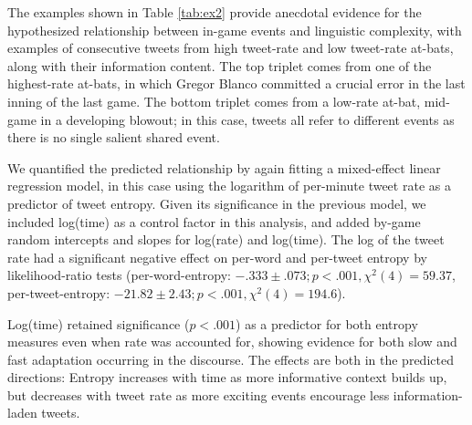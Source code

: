 \documentclass[11pt,letterpaper]{article}
\begin{document}
The examples shown in Table \ref{tab:ex2} provide anecdotal evidence for the hypothesized relationship between in-game events and linguistic complexity, with examples of consecutive tweets from high tweet-rate and low tweet-rate at-bats, along with their information content. The top triplet comes from one of the highest-rate at-bats, in which Gregor Blanco committed a crucial error in the last inning of the last game.  The bottom triplet comes from a low-rate at-bat, mid-game in a developing blowout; in this case, tweets all refer to different events as there is no single salient shared event.


We quantified the predicted relationship by again fitting a mixed-effect linear regression model, in this case using the logarithm of per-minute tweet rate as a predictor of tweet entropy.  Given its significance in the previous model, we included log(time) as a control factor in this analysis, and added by-game random intercepts and slopes for log(rate) and log(time).  The log of the tweet rate had a significant negative effect on per-word and per-tweet entropy by likelihood-ratio tests (per-word-entropy: $-.333 \pm .073; p<.001, \chi^2(4)=59.37$, per-tweet-entropy: $-21.82 \pm 2.43; p<.001, \chi^2(4)=194.6$). 

Log(time) retained significance ($p<.001$) as a predictor for both entropy measures even when rate was accounted for, showing evidence for both slow and fast adaptation occurring in the discourse.  The effects are both in the predicted directions: Entropy increases with time as more informative context builds up, but decreases with tweet rate as more exciting events encourage less information-laden tweets.
\end{document}
